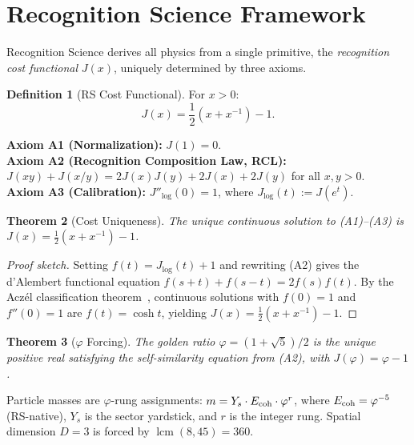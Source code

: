\documentclass[12pt,a4paper]{article}
\newtheorem{theorem}{Theorem}[section]
\theoremstyle{definition}
\newtheorem{definition}[theorem]{Definition}
\theoremstyle{remark}
\begin{document}
\section{Recognition Science Framework}
\label{sec:framework}

Recognition Science derives all physics from a single primitive,
the \emph{recognition cost functional} $J(x)$, uniquely determined
by three axioms.

\begin{definition}[RS Cost Functional]
For $x > 0$:
\begin{equation}
  J(x) = \frac{1}{2}\!\left(x + x^{-1}\right) - 1.
\end{equation}
\end{definition}

\noindent\textbf{Axiom A1 (Normalization):} $J(1) = 0$.\\
\textbf{Axiom A2 (Recognition Composition Law, RCL):}
$J(xy) + J(x/y) = 2J(x)J(y) + 2J(x) + 2J(y)$ for all $x, y > 0$.\\
\textbf{Axiom A3 (Calibration):} $J''_{\log}(0) = 1$, where
$J_{\log}(t) := J(e^t)$.

\begin{theorem}[Cost Uniqueness]
\label{thm:unique}
The unique continuous solution to \textup{(A1)--(A3)} is
$J(x) = \tfrac{1}{2}(x + x^{-1}) - 1$.
\end{theorem}

\begin{proof}[Proof sketch]
Setting $f(t) = J_{\log}(t) + 1$ and rewriting \textup{(A2)} gives
the d'Alembert functional equation $f(s+t) + f(s-t) = 2f(s)f(t)$.
By the Acz\'el classification theorem~\cite{Aczel1966}, continuous
solutions with $f(0) = 1$ and $f''(0) = 1$ are $f(t) = \cosh t$,
yielding $J(x) = \tfrac{1}{2}(x + x^{-1}) - 1$.
\end{proof}

\begin{theorem}[$\varphi$ Forcing]
\label{thm:phi}
The golden ratio $\varphi = (1+\sqrt{5})/2$ is the unique positive
real satisfying the self-similarity equation from \textup{(A2)},
with $J(\varphi) = \varphi - 1$.
\end{theorem}

\noindent Particle masses are $\varphi$-rung assignments:
$m = Y_s \cdot E_{\rm coh} \cdot \varphi^r$,
where $E_{\rm coh} = \varphi^{-5}$ (RS-native), $Y_s$ is the sector
yardstick, and $r$ is the integer rung.  Spatial dimension $D = 3$
is forced by $\operatorname{lcm}(8, 45) = 360$.
\end{document}
